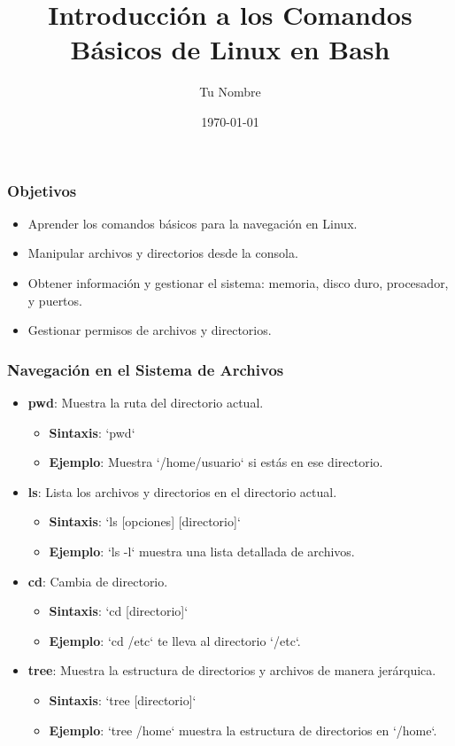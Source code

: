 \documentclass{beamer}
\title{Introducción a los Comandos Básicos de Linux en Bash}
\author{Tu Nombre}
\date{\today}
\begin{document}
\frame{\titlepage}

\begin{frame}
\frametitle{Objetivos}
\begin{itemize}
    \item Aprender los comandos básicos para la navegación en Linux.
    \item Manipular archivos y directorios desde la consola.
    \item Obtener información y gestionar el sistema: memoria, disco duro, procesador, y puertos.
    \item Gestionar permisos de archivos y directorios.
\end{itemize}
\end{frame}

\begin{frame}
\frametitle{Navegación en el Sistema de Archivos}
\begin{itemize}
    \item \textbf{pwd}: Muestra la ruta del directorio actual.
    \begin{itemize}
        \item \textbf{Sintaxis}: `pwd`
        \item \textbf{Ejemplo}: Muestra `/home/usuario` si estás en ese directorio.
    \end{itemize}
    \item \textbf{ls}: Lista los archivos y directorios en el directorio actual.
    \begin{itemize}
        \item \textbf{Sintaxis}: `ls [opciones] [directorio]`
        \item \textbf{Ejemplo}: `ls -l` muestra una lista detallada de archivos.
    \end{itemize}
    \item \textbf{cd}: Cambia de directorio.
    \begin{itemize}
        \item \textbf{Sintaxis}: `cd [directorio]`
        \item \textbf{Ejemplo}: `cd /etc` te lleva al directorio `/etc`.
    \end{itemize}
    \item \textbf{tree}: Muestra la estructura de directorios y archivos de manera jerárquica.
    \begin{itemize}
        \item \textbf{Sintaxis}: `tree [directorio]`
        \item \textbf{Ejemplo}: `tree /home` muestra la estructura de directorios en `/home`.
    \end{itemize}
\end{itemize}
\end{frame}
\end{document}
